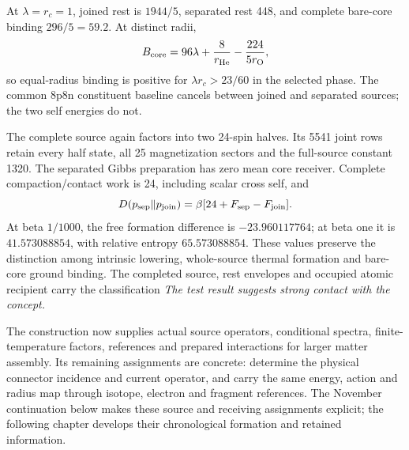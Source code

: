 At \(\lambda=r_c=1\), joined rest is \(1944/5\), separated rest 448,
and complete bare-core binding \(296/5=59.2\). At distinct radii,
\[
 B_{\rm core}=96\lambda+\frac8{r_{\rm He}}
                    -\frac{224}{5r_{\rm O}},
\]
so equal-radius binding is positive for \(\lambda r_c>23/60\) in the
selected phase. The common 8p8n constituent baseline cancels between
joined and separated sources; the two self energies do not.

The complete source again factors into two 24-spin halves. Its 5541
joint rows retain every half state, all 25 magnetization sectors and
the full-source constant 1320. The separated Gibbs preparation has
zero mean core receiver. Complete compaction/contact work is 24,
including scalar cross self, and
\[
 D(p_{\rm sep}\Vert p_{\rm join})
       =\beta[24+F_{\rm sep}-F_{\rm join}].
\]
At beta \(1/1000\), the free formation difference is \(-23.960117764\);
at beta one it is \(41.573088854\), with relative entropy
\(65.573088854\). These values preserve the distinction among intrinsic
lowering, whole-source thermal formation and bare-core ground binding.
The completed source, rest envelopes and occupied atomic recipient carry
the classification \emph{The test result suggests strong contact with
the concept.}

The construction now supplies actual source operators, conditional spectra,
finite-temperature factors, references and prepared interactions for larger
matter assembly. Its remaining assignments are concrete: determine the
physical connector incidence and current operator, and carry the same
energy, action and radius map through isotope, electron and fragment
references. The November continuation below makes these source and receiving
assignments explicit; the following chapter develops their chronological
formation and retained information.


